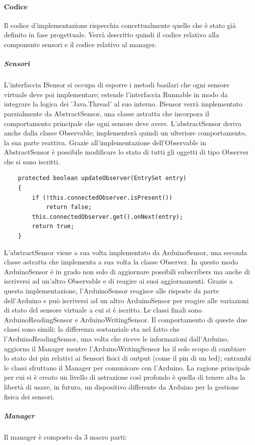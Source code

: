 \documentclass[12pt]{article}
\begin{document}
\paragraph{Codice}
Il codice d'implementazione rispecchia concettualmente quello che è stato già definito in fase progettuale. Verrà descritto quindi il codice relativo alla componente sensori e il codice relativo al manager.
\subparagraph{Sensori}
L'interfaccia ISensor si occupa di esporre i metodi basilari che ogni sensore virtuale deve poi implementare; estende l'interfaccia Runnable in modo da integrare la logica dei 'Java.Thread' al suo interno. ISensor verrà implementato parzialmente da AbstractSensor, una classe astratta che incorpora il comportamento principale che ogni sensore deve avere.
L'abstractSensor deriva anche dalla classe Observable; implementerà quindi un ulteriore comportamento, la sua parte reattiva. Grazie all'implementazione dell'Observable in AbstractSensor è possibile modificare lo stato di tutti gli oggetti di tipo Observer che si sono iscritti.
\begin{lstlisting}
	protected boolean updateObserver(EntrySet entry)
	{
		if (!this.connectedObserver.isPresent())
			return false;
		this.connectedObserver.get().onNext(entry);
		return true;
	}
\end{lstlisting}
L'abstractSensor viene a sua volta implementato da ArduinoSensor, una seconda classe astratta che implementa a sua volta la classe Observer. In questo modo ArduinoSensor è in grado non solo di aggiornare possibili subscribers ma anche di iscriversi ad un'altro Observable e di reagire ai suoi aggiornamenti. Grazie a questa implementazione, l'ArduinoSensor reagisce alle risposte da parte dell'Arduino e può iscriversi ad un altro ArduinoSensor per reagire alle variazioni di stato del sensore virtuale a cui si è iscritto.
Le classi finali sono ArduinoReadingSensor e ArduinoWritingSensor.
Il comportamento di queste due classi sono simili; la differenza sostanziale sta nel fatto che l'ArduinoReadingSensor, una volta che riceve le informazioni dall'Arduino, aggiorna il Manager mentre l'ArduinoWritingSensor ha il solo scopo di cambiare lo stato dei pin relativi ai Sensori fisici di output (come il pin di un led); entrambi le classi sfruttano il Manager per comunicare con l'Arduino.
La ragione principale per cui si è creato un livello di astrazione così profondo è quella di tenere alta la libertà di usare, in futuro, un dispositivo differente da Arduino per la gestione fisica dei sensori. 
\subparagraph{Manager}
Il manager è composto da 3 macro parti:
\end{document}
